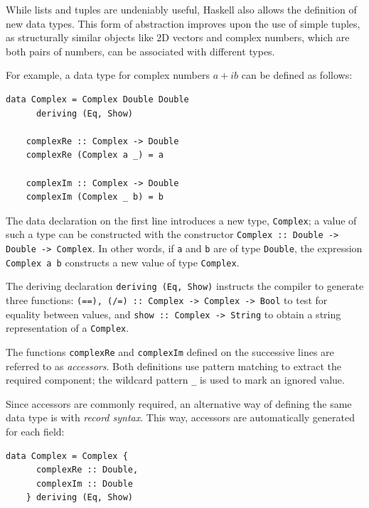 \documentclass[UdineBachThesis,american,11pt]{PhdThesis}
\begin{document}
  While lists and tuples are undeniably useful, Haskell also allows the
  definition of new data types. This form of abstraction improves upon the use
  of simple tuples, as structurally similar objects like 2D vectors and complex
  numbers, which are both pairs of numbers, can be associated with different
  types.

  For example, a data type for complex numbers \mbox{$a + i b$} can be defined
  as follows:

  \begin{Verbatim}[gobble=4,fontsize=\small]
    data Complex = Complex Double Double
      deriving (Eq, Show)

    complexRe :: Complex -> Double
    complexRe (Complex a _) = a

    complexIm :: Complex -> Double
    complexIm (Complex _ b) = b
  \end{Verbatim}

  The data declaration on the first line introduces a new type,
  \mbox{\texttt{Complex}}; a value of such a type can be constructed with the
  constructor \mbox{\texttt{Complex :: Double -> Double -> Complex}}. In other
  words, if \texttt{a} and \texttt{b} are of type \mbox{\texttt{Double}}, the
  expression \mbox{\texttt{Complex a b}} constructs a new value of type
  \mbox{\texttt{Complex}}.

  The deriving declaration \mbox{\texttt{deriving (Eq, Show)}} instructs the
  compiler to generate three functions:
  \mbox{\texttt{(==), (/=) :: Complex -> Complex -> Bool}} to test for equality
  between values, and \mbox{\texttt{show :: Complex -> String}} to obtain a
  string representation of a \mbox{\texttt{Complex}}.

  The functions \mbox{\texttt{complexRe}} and \mbox{\texttt{complexIm}} defined
  on the successive lines are referred to as \emph{accessors}. Both definitions
  use pattern matching to extract the required component; the wildcard pattern
  \texttt{\_} is used to mark an ignored value.

  Since accessors are commonly required, an alternative way of defining the same
  data type is with \emph{record syntax}. This way, accessors are automatically
  generated for each field:

  \begin{Verbatim}[gobble=4,fontsize=\small]
    data Complex = Complex {
      complexRe :: Double,
      complexIm :: Double
    } deriving (Eq, Show)
  \end{Verbatim}
\end{document}
